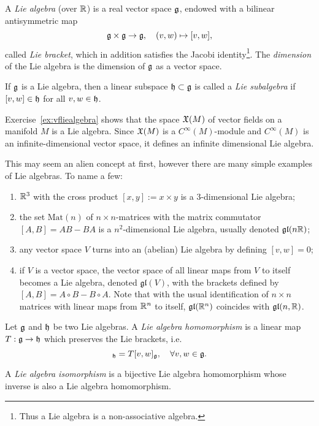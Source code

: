\begin{definition}\label{def:LieAlgebra}
  A \emph{Lie algebra} (over $\mathbb{R}$) is a real vector space $\mathfrak{g}$, endowed with a bilinear antisymmetric map
  \begin{equation}
    \mathfrak{g} \times \mathfrak{g} \to \mathfrak{g}, \quad (v,w)\mapsto [v,w],
  \end{equation}
  called \emph{Lie bracket}, which in addition satisfies the Jacobi identity\footnote{Thus a Lie algebra is a non-associative algebra.}. 
  The \emph{dimension} of the Lie algebra is the dimension of $\mathfrak{g}$ as a vector space.

  If $\mathfrak{g}$ is a Lie algebra, then a linear subspace $\mathfrak{h}\subset\mathfrak{g}$ is called a \emph{Lie subalgebra} if $[v,w]\in\mathfrak{h}$ for all $v,w\in\mathfrak{h}$.
\end{definition}

\begin{example}
  Exercise~\ref{ex:vfliealgebra} shows that the space $\mathfrak{X}(M)$ of vector fields on a manifold $M$ is a Lie algebra.
  Since $\mathfrak{X}(M)$ is a $C^\infty(M)$-module and $C^\infty(M)$ is an infinite-dimensional vector space, it defines an infinite dimensional Lie algebra.

  This may seem an alien concept at first, however there are many simple examples of Lie algebras. To name a few:
  \begin{enumerate}
    \item $\mathbb{R}^3$ with the cross product $[x,y]:=x\times y$ is a $3$-dimensional Lie algebra;
    \item the set $\mathrm{Mat}(n)$ of $n\times n$-matrices with the matrix commutator $[A,B] = AB-BA$ is a $n^2$-dimensional Lie algebra, usually denoted $\mathfrak{gl}(n\mathbb{R})$;
    \item any vector space $V$ turns into an (abelian) Lie algebra by defining $[v,w]=0$;
    \item if $V$ is a vector space, the vector space of all linear maps from $V$ to itself becomes a Lie algebra, denoted $\mathfrak{gl}(V)$, with the brackets defined by $[A,B] = A\circ B-B\circ A$. Note that with the usual identification of $n\times n$ matrices with linear maps from $\mathbb{R}^n$ to itself, $\mathfrak{gl}(\mathbb{R}^n)$ coincides with $\mathfrak{gl}(n, \mathbb{R})$.
  \end{enumerate}
\end{example}

\begin{definition}
  Let $\mathfrak{g}$ and $\mathfrak{h}$ be two Lie algebras. A \emph{Lie algebra homomorphism} is a linear map $T:\mathfrak{g}\to\mathfrak{h}$ which preserves the Lie brackets, i.e.
  \begin{equation}
    [Tv, Tw]_\fh = T[v,w]_\fg, \quad \forall v,w\in\fg.
  \end{equation}

  A \emph{Lie algebra isomorphism} is a bijective Lie algebra homomorphism whose inverse is also a Lie algebra homomorphism.
\end{definition}


